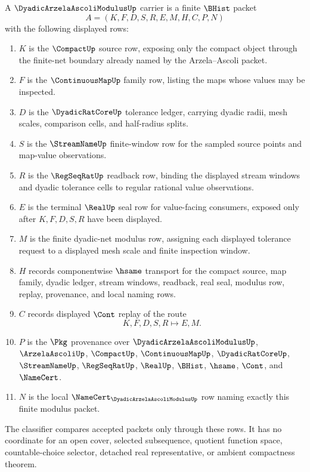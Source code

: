 \begin{definition}
\label{def:dyadic-arzela-ascoli-modulus-carrier}
A $\DyadicArzelaAscoliModulusUp$ carrier is a finite $\BHist$ packet
$$
A=(K,F,D,S,R,E,M,H,C,P,N)
$$
with the following displayed rows:
\begin{enumerate}
\item $K$ is the $\CompactUp$ source row, exposing only the compact object through the finite-net boundary already named by the Arzela--Ascoli packet.
\item $F$ is the $\ContinuousMapUp$ family row, listing the maps whose values may be inspected.
\item $D$ is the $\DyadicRatCoreUp$ tolerance ledger, carrying dyadic radii, mesh scales, comparison cells, and half-radius splits.
\item $S$ is the $\StreamNameUp$ finite-window row for the sampled source points and map-value observations.
\item $R$ is the $\RegSeqRatUp$ readback row, binding the displayed stream windows and dyadic tolerance cells to regular rational value observations.
\item $E$ is the terminal $\RealUp$ seal row for value-facing consumers, exposed only after $K,F,D,S,R$ have been displayed.
\item $M$ is the finite dyadic-net modulus row, assigning each displayed tolerance request to a displayed mesh scale and finite inspection window.
\item $H$ records componentwise $\hsame$ transport for the compact source, map family, dyadic ledger, stream windows, readback, real seal, modulus row, replay, provenance, and local naming rows.
\item $C$ records displayed $\Cont$ replay of the route
$$
K,F,D,S,R \longmapsto E,M .
$$
\item $P$ is the $\Pkg$ provenance over $\DyadicArzelaAscoliModulusUp$, $\ArzelaAscoliUp$, $\CompactUp$, $\ContinuousMapUp$, $\DyadicRatCoreUp$, $\StreamNameUp$, $\RegSeqRatUp$, $\RealUp$, $\BHist$, $\hsame$, $\Cont$, and $\NameCert$.
\item $N$ is the local $\NameCert_{\DyadicArzelaAscoliModulusUp}$ row naming exactly this finite modulus packet.
\end{enumerate}
The classifier compares accepted packets only through these rows. It has no coordinate for an open cover, selected subsequence, quotient function space, countable-choice selector, detached real representative, or ambient compactness theorem.
\end{definition}

